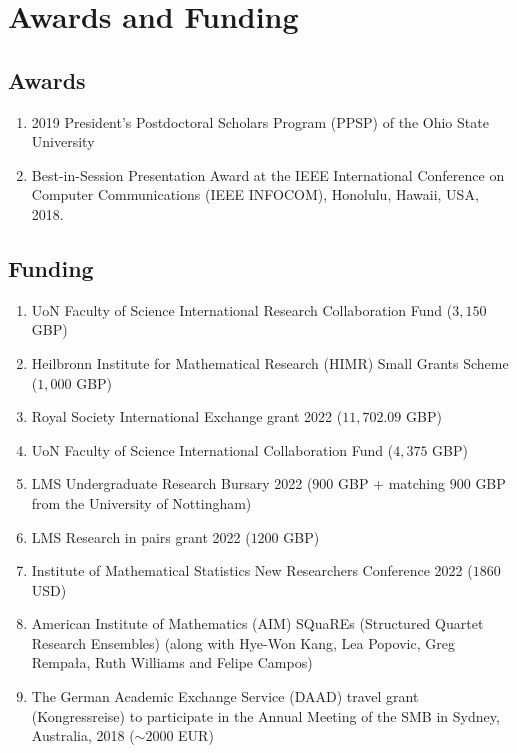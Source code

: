 \documentclass[11pt,a4paper,sans]{moderncv}        %
\begin{document}
\section{Awards and Funding}
\subsection{Awards}
\begin{enumerate}
\item{2019 President’s Postdoctoral Scholars Program (PPSP) of the Ohio State University}
\item{Best-in-Session Presentation Award at the IEEE International Conference on Computer Communications (IEEE INFOCOM), Honolulu, Hawaii, USA, 2018.}
\end{enumerate}


\subsection{Funding}
\begin{enumerate}
	\item UoN Faculty of Science International Research Collaboration Fund ($3,150$ GBP)
	\item Heilbronn Institute for Mathematical Research (HIMR) Small Grants Scheme ($1,000$ GBP)
	\item Royal Society International Exchange grant 2022 ($11,702.09$ GBP)
	\item UoN Faculty of Science International Collaboration Fund ($4,375$ GBP)
	\item LMS Undergraduate Research Bursary 2022 ($900$ GBP + matching $900$ GBP from the University of Nottingham)
	\item LMS Research in pairs grant 2022 ($1200 $ GBP)
	\item Institute of Mathematical Statistics New Researchers Conference 2022 ($1860$ USD)
	\item American Institute of Mathematics (AIM) SQuaREs (Structured Quartet Research Ensembles) (along with Hye-Won Kang, Lea Popovic, Greg Rempa{\l}a, Ruth Williams and Felipe Campos)
	\item {The  German Academic Exchange Service (DAAD) travel grant (Kongressreise) to participate in the Annual Meeting of the SMB in Sydney, Australia, 2018 ($\sim 2000$ EUR)}
\end{enumerate}

\end{document}
